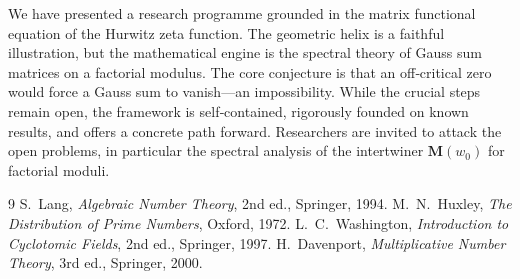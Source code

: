 \documentclass{article}
\theoremstyle{definition}
\begin{document}
We have presented a research programme grounded in the matrix functional equation of the Hurwitz zeta function. The geometric helix is a faithful illustration, but the mathematical engine is the spectral theory of Gauss sum matrices on a factorial modulus. The core conjecture is that an off‑critical zero would force a Gauss sum to vanish—an impossibility. While the crucial steps remain open, the framework is self‑contained, rigorously founded on known results, and offers a concrete path forward. Researchers are invited to attack the open problems, in particular the spectral analysis of the intertwiner \(\mathbf{M}(w_0)\) for factorial moduli.

\begin{thebibliography}{9}
S.~Lang, \emph{Algebraic Number Theory}, 2nd ed., Springer, 1994.
M.~N.~Huxley, \emph{The Distribution of Prime Numbers}, Oxford, 1972.
L.~C.~Washington, \emph{Introduction to Cyclotomic Fields}, 2nd ed., Springer, 1997.
H.~Davenport, \emph{Multiplicative Number Theory}, 3rd ed., Springer, 2000.
\end{thebibliography}
\end{document}
